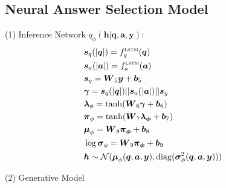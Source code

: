 \documentclass{article}
\newcommand{\nobracket}{}
\newcommand{\tmmathbf}[1]{\ensuremath{\boldsymbol{#1}}}
\newcommand{\tmop}[1]{\ensuremath{\operatorname{#1}}}
\begin{document}
\begin{appendices}
\subsection{Neural Answer Selection Model}
\label{app:nasm}
(1) Inference Network $q_{\phi} ( \tmmathbf{h} | \tmmathbf{q}, \tmmathbf{a},
\tmmathbf{y} \nobracket)$:
\begin{eqnarray}
  & \tmmathbf{s}_q ( | \tmmathbf{q} |) = f_q^{\textsc{lstm}} ( \tmmathbf{q}) & 
   \\
  & \tmmathbf{s}_a ( | \tmmathbf{a} |) = f_a^{\textsc{lstm}} ( \tmmathbf{a}) & 
   \\
  & \tmmathbf{s}_y =\tmmathbf{W}_5 \tmmathbf{y}+\tmmathbf{b}_5 &   \\
  & \tmmathbf{\gamma}=\tmmathbf{s}_q ( | \tmmathbf{q} |) | | \tmmathbf{s}_a (
  | \tmmathbf{a} |) | | \tmmathbf{s}_y &   \\
  & \tmmathbf{\lambda}_{\phi} = \tanh ( \tmmathbf{W}_6
  \tmmathbf{\gamma}+\tmmathbf{b}_6) &   \\
  & \tmmathbf{\pi}_{\phi} = \tanh ( \tmmathbf{W}_7
  \tmmathbf{\tmmathbf{\lambda}_{\phi}} +\tmmathbf{b}_7) &   \\
  & \tmmathbf{\mu}_{\phi} =\tmmathbf{W}_8 \tmmathbf{\tmmathbf{\pi}_{\phi}}
  +\tmmathbf{b}_8  &   \\
  & \log \tmmathbf{\sigma}_{\phi} =\tmmathbf{W}_9
  \tmmathbf{\tmmathbf{\pi}_{\phi}} +\tmmathbf{b}_9  &   \\
  & \tmmathbf{h} \sim \mathcal{N} ( \tmmathbf{\mu}_{\phi} ( \tmmathbf{q},
  \tmmathbf{a}, \tmmathbf{y}), \tmop{diag} ( \tmmathbf{\sigma}_{\phi}^2 (
  \tmmathbf{q}, \tmmathbf{a}, \tmmathbf{y}))) &   
\end{eqnarray}

(2) Generative Model


\end{appendices}
\end{document}
